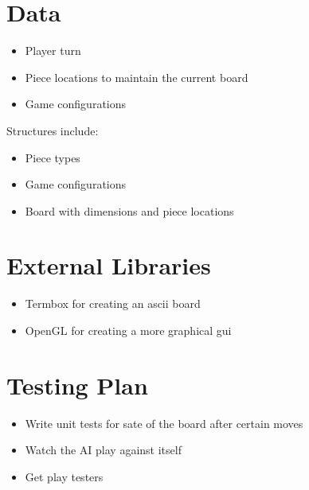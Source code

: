 \documentclass[11pt, oneside]{article}
\begin{document}
\section{Data}
\begin{itemize}
\item Player turn
\item Piece locations to maintain the current board
\item Game configurations
\end{itemize}
Structures include:
\begin{itemize}
\item Piece types
\item Game configurations
\item Board with dimensions and piece locations
\end{itemize}

\section{External Libraries}
\begin{itemize}
\item Termbox for creating an ascii board
\item OpenGL for creating a more graphical gui
\end{itemize}

\section{Testing Plan}
\begin{itemize}
\item Write unit tests for sate of the board after certain moves
\item Watch the AI play against itself
\item Get play testers
\end{itemize}
\end{document}
